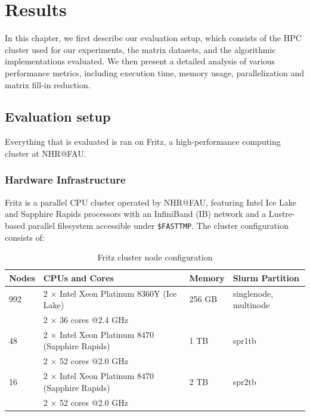 \chapter{Results}
\label{ch:results}

In this chapter, we first describe our evaluation setup, which consists of the HPC cluster used for our experiments, the matrix datasets, and the algorithmic implementations evaluated. We then present a detailed analysis of various performance metrics, including execution time, memory usage, parallelization and matrix fill-in reduction. 



\section{Evaluation setup}

Everything that is evaluated is ran on Fritz, a high-performance computing cluster at NHR@FAU.

\subsection{Hardware Infrastructure}

Fritz is a parallel CPU cluster operated by NHR@FAU, featuring Intel Ice Lake and Sapphire Rapids processors with an InfiniBand (IB) network and a Lustre-based parallel filesystem accessible under \texttt{\$FASTTMP}. The cluster configuration consists of:
\begin{table}[h]
\centering
\begin{tabular}{|p{1.5cm}|p{4.5cm}|p{2cm}|p{3cm}|}
\hline
\textbf{Nodes} & \textbf{CPUs and Cores} & \textbf{Memory} & \textbf{Slurm Partition} \\
\hline
992 & 2 × Intel Xeon Platinum 8360Y (Ice Lake) & 256 GB & singlenode, multinode \\
  & 2 × 36 cores @2.4 GHz & & \\
\hline
48 & 2 × Intel Xeon Platinum 8470 (Sapphire Rapids) & 1 TB & spr1tb \\
   & 2 × 52 cores @2.0 GHz & & \\
\hline
16 & 2 × Intel Xeon Platinum 8470 (Sapphire Rapids) & 2 TB & spr2tb \\
   & 2 × 52 cores @2.0 GHz & & \\
\hline
\end{tabular}
\caption{Fritz cluster node configuration}
\label{tab:fritz-nodes}
\end{table}

